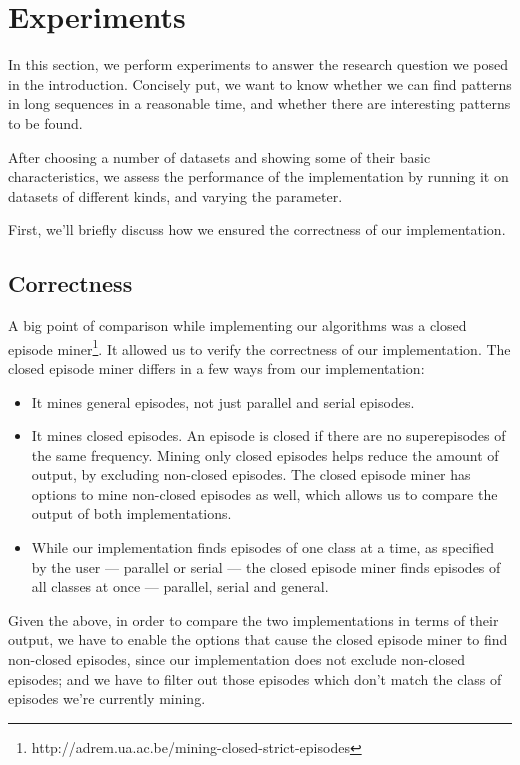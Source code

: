 \chapter{Experiments}
\label{sec:experiments}

In this section, we perform experiments to answer the research question we posed in the introduction. Concisely put, we want to know whether we can find patterns in long sequences in a reasonable time, and whether there are interesting patterns to be found.

After choosing a number of datasets and showing some of their basic characteristics, we assess the performance of the implementation by running it on datasets of different kinds, and varying the parameter.

First, we'll briefly discuss how we ensured the correctness of our implementation.

\section{Correctness}

A big point of comparison while implementing our algorithms was a closed episode miner\footnote{http://adrem.ua.ac.be/mining-closed-strict-episodes}. It allowed us to verify the correctness of our implementation. The closed episode miner differs in a few ways from our implementation:

\begin{itemize}
\item It mines general episodes, not just parallel and serial episodes.
\item It mines closed episodes. An episode is closed if there are no superepisodes of the same frequency. Mining only closed episodes helps reduce the amount of output, by excluding non-closed episodes. The closed episode miner has options to mine non-closed episodes as well, which allows us to compare the output of both implementations.
\item While our implementation finds episodes of one class at a time, as specified by the user --- parallel or serial --- the closed episode miner finds episodes of all classes at once --- parallel, serial and general.
\end{itemize}

Given the above, in order to compare the two implementations in terms of their output, we have to enable the options that cause the closed episode miner to find non-closed episodes, since our implementation does not exclude non-closed episodes; and we have to filter out those episodes which don't match the class of episodes we're currently mining.

